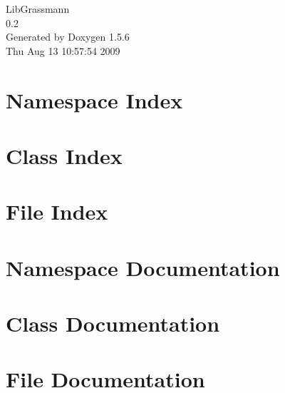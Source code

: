\documentclass[a4paper]{book}
\begin{document}
\begin{titlepage}
\vspace*{7cm}
\begin{center}
{\Large LibGrassmann \\[1ex]\large 0.2 }\\
\vspace*{1cm}
{\large Generated by Doxygen 1.5.6}\\
\vspace*{0.5cm}
{\small Thu Aug 13 10:57:54 2009}\\
\end{center}
\end{titlepage}
\clearemptydoublepage
{}
\tableofcontents
\clearemptydoublepage
{}
\chapter{Namespace Index}

\chapter{Class Index}

\chapter{File Index}

\chapter{Namespace Documentation}

\chapter{Class Documentation}










\chapter{File Documentation}


\printindex
\end{document}
